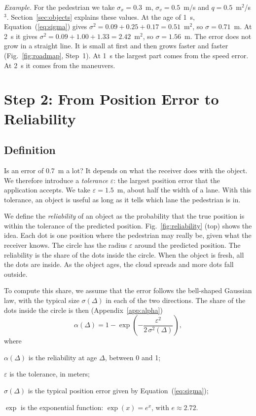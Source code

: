 \documentclass[conference]{IEEEtran}
\newcommand{\Eq}[1]{Equation~(\ref{#1})}     %
\newenvironment{where}{\begin{list}{\textbullet}{\setlength{\topsep}{2pt}\setlength{\partopsep}{0pt}%
\setlength{\itemsep}{0pt}\setlength{\parsep}{0pt}\setlength{\leftmargin}{1.5em}%
\setlength{\labelwidth}{0.6em}\setlength{\labelsep}{0.5em}}}{\end{list}}
\begin{document}
\emph{Example.} For the pedestrian we take $\sigma_x=0.3$~m,
$\sigma_v=0.5$~m/s and $q=0.5$~m$^2$/s$^3$. Section~\ref{sec:objects} explains
these values. At the age of 1~s, \Eq{eq:sigma} gives
$\sigma^2=0.09+0.25+0.17=0.51$~m$^2$, so $\sigma=0.71$~m. At 2~s it gives
$\sigma^2=0.09+1.00+1.33=2.42$~m$^2$, so $\sigma=1.56$~m. The error does not
grow in a straight line. It is small at first and then grows faster and faster
(Fig.~\ref{fig:roadmap}, Step~1). At 1~s the largest part comes from the speed
error. At 2~s it comes from the maneuvers.

\section{Step 2: From Position Error to Reliability}\label{sec:step2}

\subsection{Definition}

Is an error of 0.7~m a lot? It depends on what the receiver does with the
object. We therefore introduce a \emph{tolerance} $\varepsilon$: the largest
position error that the application accepts. We take $\varepsilon=1.5$~m,
about half the width of a lane. With this tolerance, an object is useful as
long as it tells which lane the pedestrian is in.

We define the \emph{reliability} of an object as the probability that the true
position is within the tolerance of the predicted position.
Fig.~\ref{fig:reliability} (top) shows the idea. Each dot is one position
where the pedestrian may really be, given what the receiver knows. The circle
has the radius $\varepsilon$ around the predicted position. The reliability is
the share of the dots inside the circle. When the object is fresh, all the
dots are inside. As the object ages, the cloud spreads and more dots fall
outside.

To compute this share, we assume that the error follows the bell-shaped
Gaussian law, with the typical size $\sigma(\Delta)$ in each of the two
directions. The share of the dots inside the circle is then
(Appendix~\ref{app:alpha})
\begin{equation}\label{eq:alpha}
\alpha(\Delta)=1-\exp\!\left(-\frac{\varepsilon^2}{2\,\sigma^2(\Delta)}\right),
\end{equation}
where
\begin{where}
\item $\alpha(\Delta)$ is the reliability at age $\Delta$, between 0 and 1;
\item $\varepsilon$ is the tolerance, in meters;
\item $\sigma(\Delta)$ is the typical position error given by \Eq{eq:sigma};
\item $\exp$ is the exponential function: $\exp(x)=e^x$, with $e\approx2.72$.
\end{where}
\end{document}
